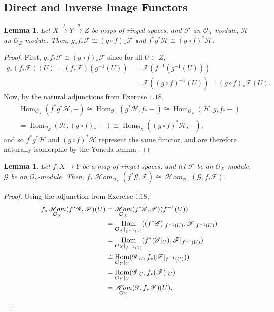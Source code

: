 \documentclass[10pt]{article}
\newtheorem{lemma}[subsubsection]{Lemma}
\theoremstyle{definition}
\theoremstyle{remark}
\numberwithin{equation}{section}
\numberwithin{figure}{subsubsection}
\DeclareMathOperator{\Hom}{Hom}
\newcommand{\FF}{\mathscr{F}}
\newcommand{\GG}{\mathscr{G}}
\newcommand{\HH}{\mathscr{H}}
\newcommand{\OO}{\mathcal{O}}
\DeclareMathOperator{\HHom}{\mathscr{H}\!\mathit{om}}
\begin{document}
\subsection{Direct and Inverse Image Functors}
\begin{lemma}\label{invimgcomp}
  Let $X \overset{f}{\to} Y \overset{g}{\to} Z$ be maps of ringed spaces, and $\FF$ an $\OO_X$-module, $\HH$ an $\OO_Z$-module. Then, $g_*f_*\FF \cong (g \circ f)_*\FF$ and $f^*g^*\HH \cong (g \circ f)^*\HH$.
\end{lemma}
\begin{proof}
  First, $g_*f_*\FF \cong (g \circ f)_*\FF$ since for all $U \subset Z$,
  \begin{align*}
    g_*(f_*\FF)(U) = (f_*\FF)(g^{-1}(U)) &= \FF(f^{-1}(g^{-1}(U)))\\
    &= \FF((g \circ f)^{-1}(U)) = (g \circ f)_*\FF(U).
  \end{align*}
  Now, by the natural adjunctions from Exercise $1.18$,
  \begin{multline*}
    \Hom_{\OO_X}(f^*g^*\HH,-) \cong \Hom_{\OO_Y}(g^*\HH,f_*-) \cong \Hom_{\OO_Z}(\HH,g_*f_*-)\\
    = \Hom_{\OO_Z}(\HH,(g \circ f)_*-) \cong \Hom_{\OO_X}((g \circ f)^*\HH,-),
  \end{multline*}
  and so $f^*g^*\HH$ and $(g \circ f)^*\HH$ represent the same functor, and are therefore naturally isomorphic by the Yoneda lemma \cite[p.~61]{Mac98}.
\end{proof}
\begin{lemma}\label{pfhom}
  Let $f\colon X \to Y$ be a map of ringed spaces, and let $\FF$ be an $\OO_X$-module, $\GG$ be an $\OO_Y$-module. Then, $f_*\HHom_{\OO_X}(f^*\GG,\FF) \cong \HHom_{\OO_Y}(\GG,f_*\FF)$.
\end{lemma}
\begin{proof}
  Using the adjunction from Exercise $1.18$,
  \begin{align*}
    f_*\HHom_{\OO_X}(f^*\GG,\FF)(U) &= \HHom_{\OO_X}(f^*\GG,\FF)(f^{-1}(U))\\
    &= \Hom_{\OO_X\vert_{f^{-1}(U)}}((f^*\GG)\vert_{f^{-1}(U)},\FF\vert_{f^{-1}(U)})\\
    &= \Hom_{\OO_X\vert_{f^{-1}(U)}}(f^*(\GG\vert_U),\FF\vert_{f^{-1}(U)})\\
    &\cong \Hom_{\OO_Y\vert_{U}}(\GG\vert_U,f_*(\FF\vert_{f^{-1}(U)}))\\
    &= \Hom_{\OO_Y\vert_{U}}(\GG\vert_U,f_*(\FF)\vert_U)\\
    &= \HHom_{\OO_Y}(\GG,f_*\FF)(U).\qedhere
  \end{align*}
\end{proof}
\end{document}
